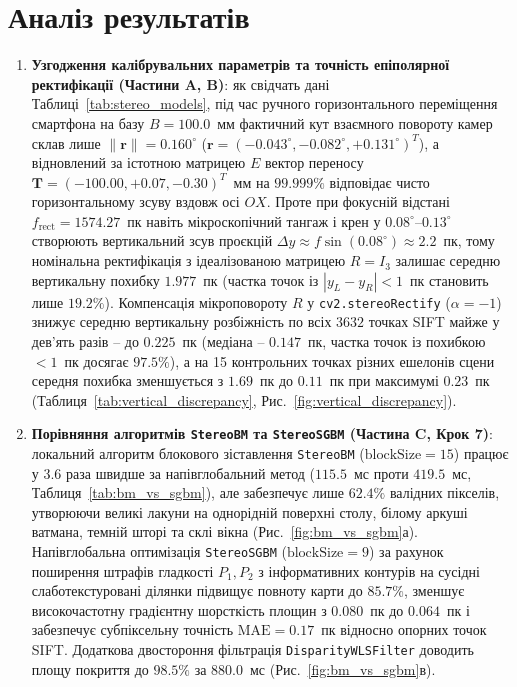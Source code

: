 \documentclass[14pt, a4paper]{extarticle}
\begin{document}
\section{Аналіз результатів}
\begin{enumerate}
    \item \textbf{Узгодження калібрувальних параметрів та точність епіполярної ректифікації (Частини A, B)}: як свідчать дані Таблиці~\ref{tab:stereo_models}, під час ручного горизонтального переміщення смартфона на базу $B = 100.0$~мм фактичний кут взаємного повороту камер склав лише $\|\mathbf{r}\| = 0.160^\circ$ ($\mathbf{r} = (-0.043^\circ, -0.082^\circ, +0.131^\circ)^T$), а відновлений за істотною матрицею $E$ вектор переносу $\mathbf{T} = (-100.00, +0.07, -0.30)^T$~мм на $99.999\%$ відповідає чисто горизонтальному зсуву вздовж осі $O X$. Проте при фокусній відстані $f_{\text{rect}} = 1574.27$~пк навіть мікроскопічний тангаж і крен у $0.08^\circ$--$0.13^\circ$ створюють вертикальний зсув проєкцій $\Delta y \approx f \sin(0.08^\circ) \approx 2.2$~пк, тому номінальна ректифікація з ідеалізованою матрицею $R = I_3$ залишає середню вертикальну похибку $1.977$~пк (частка точок із $|y_L - y_R| < 1$~пк становить лише $19.2\%$). Компенсація мікроповороту $R$ у \texttt{cv2.stereoRectify} ($\alpha = -1$) знижує середню вертикальну розбіжність по всіх $3632$ точках SIFT майже у дев'ять разів -- до $\mathbf{0.225}$~пк (медіана -- $\mathbf{0.147}$~пк, частка точок із похибкою $< 1$~пк досягає $\mathbf{97.5\%}$), а на 15 контрольних точках різних ешелонів сцени середня похибка зменшується з $1.69$~пк до $\mathbf{0.11}$~пк при максимумі $0.23$~пк (Таблиця~\ref{tab:vertical_discrepancy}, Рис.~\ref{fig:vertical_discrepancy}).

    \item \textbf{Порівняння алгоритмів \texttt{StereoBM} та \texttt{StereoSGBM} (Частина C, Крок 7)}: локальний алгоритм блокового зіставлення \texttt{StereoBM} ($\text{blockSize} = 15$) працює у $3.6$ раза швидше за напівглобальний метод ($115.5$~мс проти $419.5$~мс, Таблиця~\ref{tab:bm_vs_sgbm}), але забезпечує лише $62.4\%$ валідних пікселів, утворюючи великі лакуни на однорідній поверхні столу, білому аркуші ватмана, темній шторі та склі вікна (Рис.~\ref{fig:bm_vs_sgbm}а). Напівглобальна оптимізація \texttt{StereoSGBM} ($\text{blockSize} = 9$) за рахунок поширення штрафів гладкості $P_1, P_2$ з інформативних контурів на сусідні слаботекстуровані ділянки підвищує повноту карти до $\mathbf{85.7\%}$, зменшує високочастотну градієнтну шорсткість площин з $0.080$~пк до $\mathbf{0.064}$~пк і забезпечує субпіксельну точність $\text{MAE} = 0.17$~пк відносно опорних точок SIFT. Додаткова двостороння фільтрація \texttt{DisparityWLSFilter} доводить площу покриття до $98.5\%$ за $880.0$~мс (Рис.~\ref{fig:bm_vs_sgbm}в).


\end{enumerate}
\end{document}
